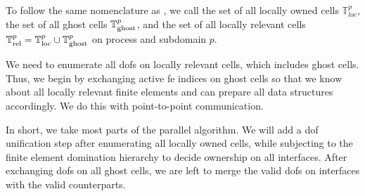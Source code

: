 To follow the same nomenclature as \cite{bangerth2012}, we call the set of all locally owned cells $\mathbb{T}^p_{loc}$, the set of all ghost cells $\mathbb{T}^p_{\text{ghost}}$, and the set of all locally relevant cells $\mathbb{T}^p_{\text{rel}} = \mathbb{T}^p_{\text{loc}} \cup \mathbb{T}^p_{\text{ghost}}$ on process and subdomain $p$.

We need to enumerate all \glspl{dof} on locally relevant cells, which includes ghost cells. Thus, we begin by exchanging active fe indices on ghost cells so that we know about all locally relevant finite elements and can prepare all data structures accordingly. We do this with point-to-point communication.

In short, we take most parts of the parallel algorithm. We will add a \gls{dof} unification step after enumerating all locally owned cells, while subjecting to the finite element domination hierarchy to decide ownership on all interfaces. After exchanging \glspl{dof} on all ghost cells, we are left to merge the valid \glspl{dof} on interfaces with the valid counterparts.

